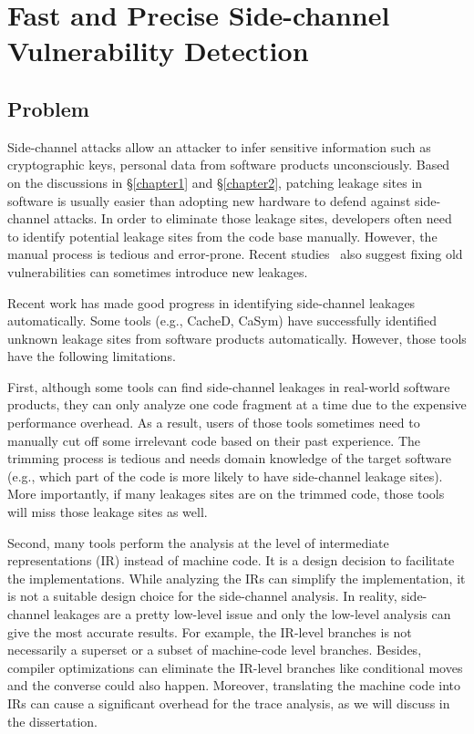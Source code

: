 
\chapter{Fast and Precise Side-channel Vulnerability Detection}\label{chapter3}
\section{Problem}
Side-channel attacks allow an attacker to infer sensitive information such as cryptographic keys, personal data from software products unconsciously. Based on the discussions in \S\ref{chapter1} and \S\ref{chapter2}, patching leakage sites in software is usually easier than adopting new hardware to defend against side-channel attacks. In order to eliminate those leakage sites, developers often need to identify potential leakage sites from the code base manually. However, the manual process is tedious and error-prone. Recent studies~\cite{203878} also suggest fixing old vulnerabilities can sometimes introduce new leakages. 

Recent work has made good progress in identifying side-channel leakages automatically. Some tools (e.g., CacheD, CaSym) have successfully identified unknown leakage sites from software products automatically. However, those tools have the following limitations. 

First, although some tools can find side-channel leakages in real-world software products, they can only analyze one code fragment at a time due to the expensive performance overhead. As a result, users of those tools sometimes need to manually cut off some irrelevant code based on their past experience. The trimming process is tedious and needs domain knowledge of the target software (e.g., which part of the code is more likely to have side-channel leakage sites). More importantly, if many leakages sites are on the trimmed code, those tools will miss those leakage sites as well.

Second, many tools perform the analysis at the level of intermediate representations (IR) instead of machine code. It is a design decision to facilitate the implementations. While analyzing the IRs can simplify the implementation, it is not a suitable design choice for the side-channel analysis. In reality, side-channel leakages are a pretty low-level issue and only the low-level analysis can give the most accurate results. For example, the IR-level branches is not necessarily a superset or a subset of machine-code level branches. Besides, compiler optimizations can eliminate the IR-level branches like conditional moves and the converse could also happen. Moreover, translating the machine code into IRs can cause a significant overhead for the trace analysis, as we will discuss in the dissertation. 


